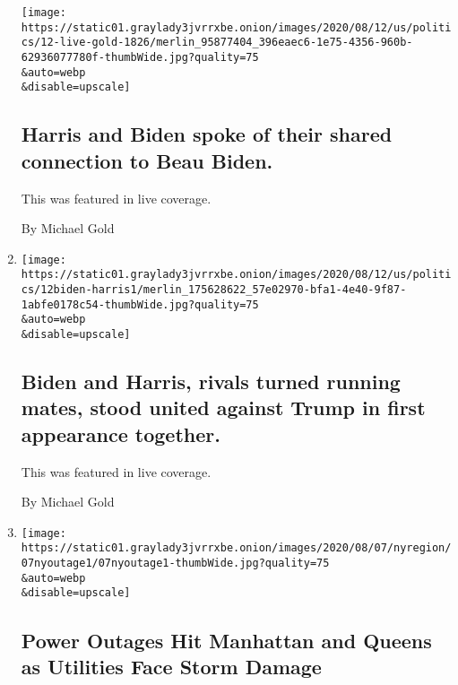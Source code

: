 \begin{enumerate}
  \texttt{[image: https://static01.graylady3jvrrxbe.onion/images/2020/08/12/us/politics/12-live-gold-1826/merlin\_95877404\_396eaec6-1e75-4356-960b-62936077780f-thumbWide.jpg?quality=75\\\&auto=webp\\\&disable=upscale]}

  \hypertarget{harris-and-biden-spoke-of-their-shared-connection-to-beau-biden}{%
  \subsection{Harris and Biden spoke of their shared connection to Beau
  Biden.}\label{harris-and-biden-spoke-of-their-shared-connection-to-beau-biden}}

  This was featured in live coverage.

  By Michael Gold
\item
  \href{/live/2020/08/12/us/biden-vs-trump/biden-and-harris-rivals-turned-running-mates-stood-united-against-trump-in-first-appearance-together}{}

  \texttt{[image: https://static01.graylady3jvrrxbe.onion/images/2020/08/12/us/politics/12biden-harris1/merlin\_175628622\_57e02970-bfa1-4e40-9f87-1abfe0178c54-thumbWide.jpg?quality=75\\\&auto=webp\\\&disable=upscale]}

  \hypertarget{biden-and-harris-rivals-turned-running-mates-stood-united-against-trump-in-first-appearance-together}{%
  \subsection{Biden and Harris, rivals turned running mates, stood
  united against Trump in first appearance
  together.}\label{biden-and-harris-rivals-turned-running-mates-stood-united-against-trump-in-first-appearance-together}}

  This was featured in live coverage.

  By Michael Gold
\item
  \href{/2020/08/07/nyregion/queens-manhattan-west-side-power-outage-coned.html}{}

  \texttt{[image: https://static01.graylady3jvrrxbe.onion/images/2020/08/07/nyregion/07nyoutage1/07nyoutage1-thumbWide.jpg?quality=75\\\&auto=webp\\\&disable=upscale]}

  \hypertarget{power-outages-hit-manhattan-and-queens-as-utilities-face-storm-damage}{%
  \subsection{Power Outages Hit Manhattan and Queens as Utilities Face
  Storm
  Damage}\label{power-outages-hit-manhattan-and-queens-as-utilities-face-storm-damage}}


\end{enumerate}
